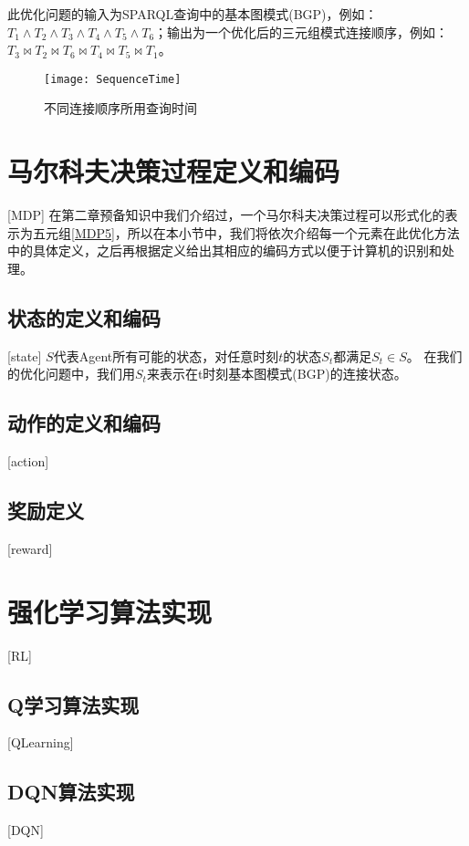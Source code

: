 此优化问题的输入为SPARQL查询中的基本图模式(BGP)，例如：$T_1\wedge T_2\wedge T_3\wedge T_4\wedge T_5\wedge T_6$；输出为一个优化后的三元组模式连接顺序，例如：$T_3 \Join T_2 \Join T_6 \Join T_4 \Join T_5 \Join T_1$。
\begin{figure}[h]
    \centering
    \texttt{[image: SequenceTime]}
    \caption{不同连接顺序所用查询时间}
    \label{SequenceTime}
\end{figure}

\section{马尔科夫决策过程定义和编码}[MDP]
在第二章预备知识中我们介绍过，一个马尔科夫决策过程可以形式化的表示为五元组\ref{MDP5}，所以在本小节中，我们将依次介绍每一个元素在此优化方法中的具体定义，之后再根据定义给出其相应的编码方式以便于计算机的识别和处理。
\subsection{状态的定义和编码}[state]
$S$代表Agent所有可能的状态，对任意时刻$t$的状态$S_t$都满足$S_t \in S$。
在我们的优化问题中，我们用$S_t$来表示在t时刻基本图模式(BGP)的连接状态。
\subsection{动作的定义和编码}[action]
\subsection{奖励定义}[reward]
\section{强化学习算法实现}[RL]
\subsection{Q学习算法实现}[QLearning]
\subsection{DQN算法实现}[DQN]
